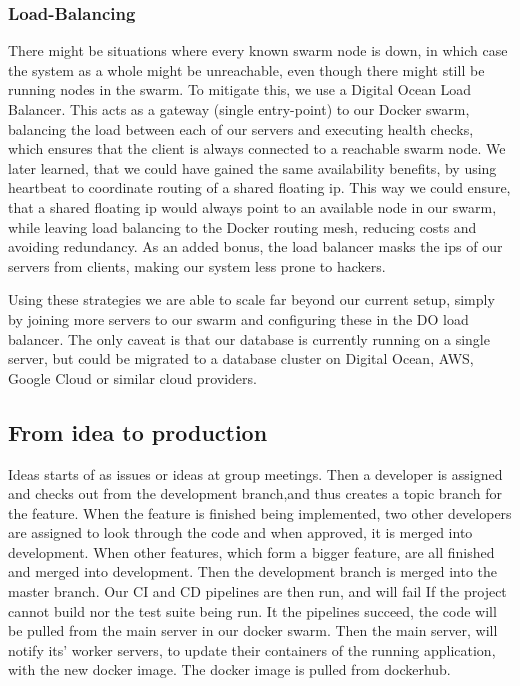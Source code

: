 \subsubsection{Load-Balancing}
There might be situations where every known swarm node is down, in which case the system as a whole might be unreachable, even though there might still be running nodes in the swarm.
\newline
To mitigate this, we use a Digital Ocean Load Balancer. This acts as a gateway (single entry-point) to our Docker swarm, balancing the load between each of our servers and executing health checks, which ensures that the client is always connected to a reachable swarm node.
\newline
We later learned, that we could have gained the same availability benefits, by using heartbeat to coordinate routing of a shared floating ip.
This way we could ensure, that a shared floating ip would always point to an available node in our swarm, while leaving load balancing to the Docker routing mesh, reducing costs and avoiding redundancy.
\newline
As an added bonus, the load balancer masks the ips of our servers from clients, making our system less prone to hackers.

Using these strategies we are able to scale far beyond our current setup, simply by joining more servers to our swarm and configuring these in the DO load balancer.
The only caveat is that our database is currently running on a single server, but could be migrated to a database cluster on Digital Ocean, AWS, Google Cloud or similar cloud providers.

\subsection{From idea to production}

Ideas starts of as issues or ideas at group meetings.
Then a developer is assigned and checks out from the development branch,and thus creates a topic branch for the feature.
When the feature is finished being implemented, two other developers are assigned to look through the code and when approved, it is merged into development.
When other features, which form a bigger feature, are all finished and merged into development.
Then the development branch is merged into the master branch.
Our CI and CD pipelines are then run, and will fail 
If the project cannot build nor the test suite being run.
It the pipelines succeed, the code will be pulled from the main server in our docker swarm.
Then the main server, will notify its' worker servers, to update their containers of the running application, with the new docker image. The docker image is pulled from dockerhub.
